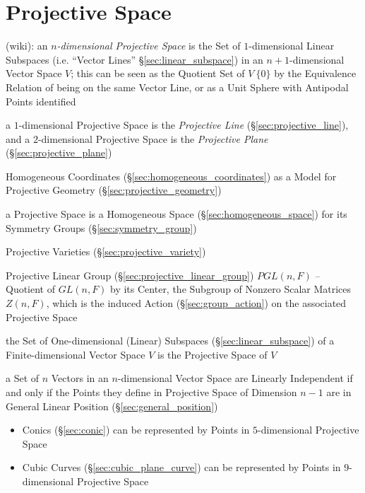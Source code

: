 \section{Projective Space}\label{sec:projective_space}

(wiki):
an \emph{$n$-dimensional Projective Space} is the Set of $1$-dimensional Linear
Subspaces (i.e. ``Vector Lines'' \S\ref{sec:linear_subspace}) in an
$n+1$-dimensional Vector Space $V$; this can be seen as the Quotient Set of $V
\ \{0\}$ by the Equivalence Relation of being on the same Vector Line, or as a
Unit Sphere with Antipodal Points identified

a $1$-dimensional Projective Space is the \emph{Projective Line}
(\S\ref{sec:projective_line}), and a $2$-dimensional Projective Space is the
\emph{Projective Plane} (\S\ref{sec:projective_plane})

Homogeneous Coordinates (\S\ref{sec:homogeneous_coordinates}) as a Model for
Projective Geometry (\S\ref{sec:projective_geometry})

a Projective Space is a Homogeneous Space (\S\ref{sec:homogeneous_space}) for
its Symmetry Groups (\S\ref{sec:symmetry_group}) %

\fist Projective Varieties (\S\ref{sec:projective_variety})

Projective Linear Group (\S\ref{sec:projective_linear_group}) $PGL(n,F)$ --
Quotient of $GL(n,F)$ by its Center, the Subgroup of Nonzero Scalar Matrices
$Z(n,F)$, which is the induced Action (\S\ref{sec:group_action}) on the
associated Projective Space

the Set of One-dimensional (Linear) Subspaces (\S\ref{sec:linear_subspace}) of a
Finite-dimensional Vector Space $V$ is the Projective Space of $V$

a Set of $n$ Vectors in an $n$-dimensional Vector Space are Linearly
Independent if and only if the Points they define in Projective Space of
Dimension $n-1$ are in General Linear Position (\S\ref{sec:general_position})

\begin{itemize}
  \item Conics (\S\ref{sec:conic}) can be represented by Points in
    $5$-dimensional Projective Space
  \item Cubic Curves (\S\ref{sec:cubic_plane_curve}) can be represented by
    Points in $9$-dimensional Projective Space
\end{itemize}

